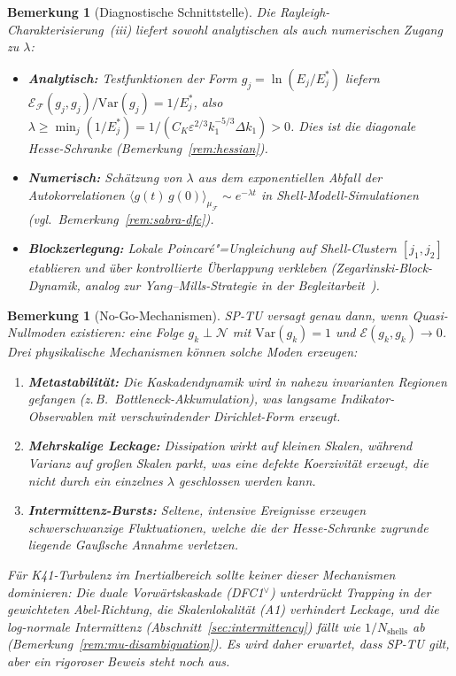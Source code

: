 \documentclass[12pt,a4paper]{article}
\theoremstyle{breakdef}
\theoremstyle{breakplain}
\theoremstyle{breakdef}
\newtheorem{remark}[definition]{Bemerkung}
\begin{document}
\begin{remark}[Diagnostische Schnittstelle]\label{rem:sp-diagnostics}
Die Rayleigh-Charakterisierung~(iii) liefert sowohl analytischen als auch numerischen Zugang zu $\lambda$:
\begin{itemize}
\item \textbf{Analytisch:} Testfunktionen der Form $g_j = \ln(E_j/E_j^*)$ liefern $\mathcal{E}_{\mathcal{F}}(g_j, g_j) / \mathrm{Var}(g_j) = 1/E_j^*$, also $\lambda \geq \min_j (1/E_j^*) = 1/(C_K \varepsilon^{2/3} k_1^{-5/3} \Delta k_1) > 0$. Dies ist die diagonale Hesse-Schranke (Bemerkung~\ref{rem:hessian}).
\item \textbf{Numerisch:} Schätzung von $\lambda$ aus dem exponentiellen Abfall der Autokorrelationen $\langle g(t)\, g(0) \rangle_{\mu_{\mathcal{F}}} \sim e^{-\lambda t}$ in Shell-Modell-Simulationen (vgl.\ Bemerkung~\ref{rem:sabra-dfc}).
\item \textbf{Blockzerlegung:} Lokale Poincaré"=Ungleichung auf Shell-Clustern $[j_1, j_2]$ etablieren und über kontrollierte Überlappung verkleben (Zegarlinski-Block-Dynamik, analog zur Yang--Mills-Strategie in der Begleitarbeit~\cite{Geiger2026-YM}).
\end{itemize}
\end{remark}

\begin{remark}[No-Go-Mechanismen]\label{rem:sp-nogo}
SP-TU versagt genau dann, wenn \emph{Quasi-Nullmoden} existieren: eine Folge $g_k \perp \mathcal{N}$ mit $\mathrm{Var}(g_k) = 1$ und $\mathcal{E}(g_k, g_k) \to 0$. Drei physikalische Mechanismen können solche Moden erzeugen:
\begin{enumerate}
\item \textbf{Metastabilität:} Die Kaskadendynamik wird in nahezu invarianten Regionen gefangen (z.\,B.\ Bottleneck-Akkumulation), was langsame Indikator-Observablen mit verschwindender Dirichlet-Form erzeugt.
\item \textbf{Mehrskalige Leckage:} Dissipation wirkt auf kleinen Skalen, während Varianz auf großen Skalen \glqq parkt\grqq{}, was eine defekte Koerzivität erzeugt, die nicht durch ein einzelnes $\lambda$ geschlossen werden kann.
\item \textbf{Intermittenz-Bursts:} Seltene, intensive Ereignisse erzeugen schwerschwanzige Fluktuationen, welche die der Hesse-Schranke zugrunde liegende Gaußsche Annahme verletzen.
\end{enumerate}
Für K41-Turbulenz im Inertialbereich sollte keiner dieser Mechanismen dominieren: Die duale Vorwärtskaskade (DFC1$^\vee$) unterdrückt Trapping in der gewichteten Abel-Richtung, die Skalenlokalität (A1) verhindert Leckage, und die log-normale Intermittenz (Abschnitt~\ref{sec:intermittency}) fällt wie $1/N_{\mathrm{shells}}$ ab (Bemerkung~\ref{rem:mu-disambiguation}). Es wird daher \emph{erwartet}, dass SP-TU gilt, aber ein rigoroser Beweis steht noch aus.
\end{remark}
\end{document}
